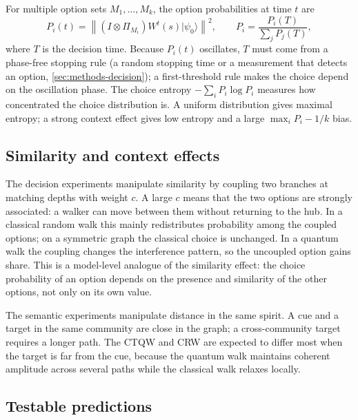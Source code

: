 For multiple option sets $M_1,\dots,M_k$, the option probabilities at time $t$
are
\begin{equation}
  P_i(t)=\left\lVert(I\otimes\Pi_{M_i})W^t(s)\lvert\psi_0\rangle\right\rVert^2,
  \qquad
  P_i=\frac{P_i(T)}{\sum_jP_j(T)},
\end{equation}
where $T$ is the decision time. Because $P_i(t)$ oscillates, $T$ must come
from a phase-free stopping rule (a random stopping time or a measurement that
detects an option, \cref{sec:methods-decision}); a first-threshold rule makes
the choice depend on the oscillation phase. The choice entropy
$-\sum_iP_i\log P_i$ measures how concentrated the choice distribution is. A
uniform distribution gives maximal entropy; a strong context effect gives low
entropy and a large $\max_iP_i-1/k$ bias.

\subsection{Similarity and context effects}
\label{sec:cognitive-context}

The decision experiments manipulate similarity by coupling two branches at
matching depths with weight $c$. A large $c$ means that the two options are
strongly associated: a walker can move between them without returning to the
hub. In a classical random walk this mainly redistributes probability among
the coupled options; on a symmetric graph the classical choice is unchanged.
In a quantum walk the coupling changes the interference pattern, so the
uncoupled option gains share. This is a
model-level analogue of the similarity effect: the choice
probability of an option depends on the presence and similarity of the other
options, not only on its own value.

The semantic experiments manipulate distance in the same spirit. A cue and a
target in the same community are close in the graph; a cross-community target
requires a longer path. The CTQW and CRW are expected to differ most when the
target is far from the cue, because the quantum walk maintains coherent
amplitude across several paths while the classical walk relaxes locally.

\subsection{Testable predictions}
\label{sec:cognitive-predictions}

